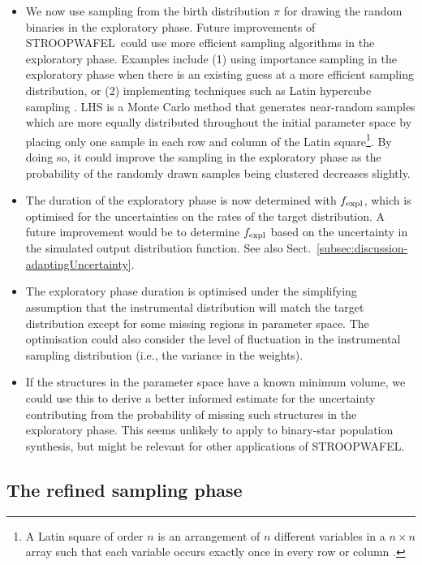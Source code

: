 \documentclass[a4paper,fleqn,usenatbib,useAMS,usedcolumn]{mnras}
\newcommand{\AISs}{\textsc{STROOPWAFEL}}
\begin{document}
\begin{itemize}
\item  We now use sampling from the birth distribution $\pi$ for drawing the random binaries in the exploratory phase. Future improvements of \AISs \ could use more efficient sampling algorithms in the exploratory phase. Examples include (1) using importance sampling in the exploratory phase when there is an existing guess at a more efficient sampling distribution, or (2) implementing techniques such as Latin hypercube sampling  \citep[LHS,][]{10.2307/1268522, eglajs1977new, iman1980latin, iman1981approach}. LHS is a  Monte Carlo method that  generates near-random samples which are more equally distributed throughout the initial parameter space by placing only one sample in each row and column of the Latin square\footnote{A Latin square of order $n$ is an arrangement of $n$ different variables in a $n \times n$ array such that each variable occurs exactly once in every row or column \citep{euler1782recherches}.}. By doing so, it could improve the sampling in the exploratory phase as the probability of the randomly drawn samples being clustered decreases slightly.
\item The duration of the exploratory phase is now determined with $f_{\rm{expl}}$, which is optimised for the uncertainties on the rates of the target distribution. A future improvement would be to determine $f_{\rm{expl}}$ based on the uncertainty in the simulated output distribution function. See also Sect.~\ref{subsec:discussion-adaptingUncertainty}. 
\item The exploratory phase duration is optimised under the simplifying assumption that the instrumental distribution will match the target distribution except for some missing regions in parameter space.  The optimisation could also consider the level of fluctuation in the instrumental sampling distribution (i.e., the variance in the weights).
\item If the structures in the parameter space have a known minimum volume, we could use this to derive a better informed estimate for the uncertainty contributing from the probability of missing  such structures in the exploratory phase.  This seems unlikely to apply to binary-star population synthesis, but might be relevant for other applications of \AISs.
\end{itemize}


\subsection{The refined sampling phase}
\label{subsec:discussion-refinedSampling}
\end{document}

